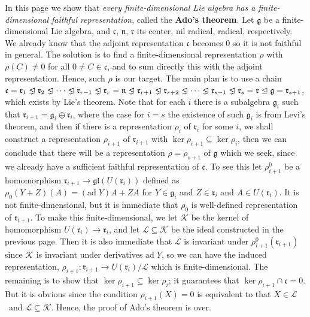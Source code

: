 \documentclass{article}
\newcommand{\lie}[1]{\mathfrak{#1}}
\newcommand{\ad}[1]{\mathrm{ad}\; #1}
\newcommand{\triangleleftneq}{%
  \mathrel{\ooalign{$\lneq$\cr\raise.22ex\hbox{$\lhd$}\cr}}}
\begin{document}
In this page we show that \textit{every finite-dimensional Lie algebra has a finite-dimensional faithful representation}, called the \textbf{Ado's theorem}.
Let $\lie{g}$ be a finite-dimensional Lie algebra, and $\lie{c}$, $\lie{n}$, $\lie{r}$ its center, nil radical, radical, respectively.
We already know that the adjoint representation $\lie{c}$ becomes 0 so it is not faithful in general.
The solution is to find a finite-dimensional representation $\rho$ with $\rho(C) \ne 0$ for all $0 \ne C \in \lie{c}$, and to sum directly this with the adjoint representation.
Hence, such $\rho$ is our target.
The main plan is to use a chain $\lie{c} = \lie{r}_1 \triangleleftneq \lie{r}_2 \triangleleftneq \cdots \triangleleftneq \lie{r}_{r - 1} \triangleleftneq \lie{r}_r = \lie{n} \triangleleftneq \lie{r}_{r + 1} \triangleleftneq \lie{r}_{r + 2} \triangleleftneq \cdots \triangleleftneq \lie{r}_{s - 1} \triangleleftneq \lie{r}_s = \lie{r} \trianglelefteq \lie{g} = \lie{r}_{s + 1}$, which exists by Lie's theorem.
Note that for each $i$ there is a subalgebra $\lie{g}_i$ such that $\lie{r}_{i + 1} = \lie{g}_i \oplus \lie{r}_i$, where the case for $i = s$ the existence of such $\lie{g}_i$ is from Levi's theorem, and then if there is a representation $\rho_i$ of $\lie{r}_i$ for some $i$, we shall construct a representation $\rho_{i + 1}$ of $\lie{r}_{i + 1}$ with $\ker{\rho_{i + 1}} \subseteq \ker{\rho_i}$, then we can conclude that there will be a representation $\rho = \rho_{s + 1}$ of $\lie{g}$ which we seek, since we already have a sufficient faithful representation of $\lie{c}$.
To see this let $\rho_{i + 1}^0$ be a homomorphism $\lie{r}_{i + 1} \to \lie{gl}(U(\lie{r}_i))$ defined as $\rho_0(Y + Z)(A) = (\ad{Y})A + ZA$ for $Y \in \lie{g}_i$ and $Z \in \lie{r}_i$ and $A \in U(\lie{r}_i)$.
It is not finite-dimensional, but it is immediate that $\rho_0$ is well-defined representation of $\lie{r}_{i + 1}$.
To make this finite-dimensional, we let $\mathcal{K}$ be the kernel of homomorphism $U(\lie{r}_i) \to \lie{r}_i$, and let $\mathcal{L} \subseteq \mathcal{K}$ be the ideal constructed in the previous page.
Then it is also immediate that $\mathcal{L}$ is invariant under $\rho_{i + 1}^0(\lie{r}_{i + 1})$ since $\mathcal{K}$ is invariant under derivatives $\ad{Y}$, so we can have the induced representation, $\rho_{i + 1} : \lie{r}_{i + 1} \to U(\lie{r}_i)/\mathcal{L}$ which is finite-dimensional.
The remaining is to show that $\ker{\rho_{i + 1}} \subseteq \ker{\rho_i}$; it guarantees that $\ker{\rho_{i + 1}} \cap \lie{c} = 0$.
But it is obvious since the condition $\rho_{i + 1}(X) = 0$ is equivalent to that $X \in \mathcal{L}$ and $\mathcal{L} \subseteq \mathcal{K}$.
Hence, the proof of Ado's theorem is over.
\end{document}

